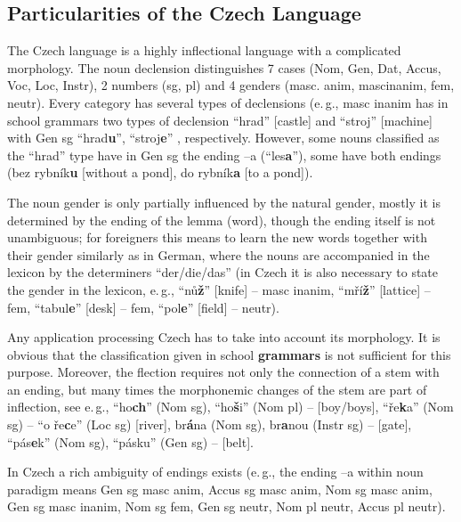 \begin{multicols}{2}
 
\subsection{Particularities of the Czech Language }

The Czech language is a highly inflectional language with a complicated morphology. The noun declension distinguishes 7 cases (Nom, Gen, Dat, Accus, Voc, Loc, Instr), 2 numbers (sg, pl) and 4 genders (masc. anim, mascinanim, fem, neutr). Every category has several types of declensions (e.\,g., masc inanim has in school grammars two types of declension “hrad” {[}castle{]} and “stroj” {[}machine{]} with Gen sg “hrad\textbf{u}”, “stroj\textbf{e}” , respectively. However, some nouns classified as the “hrad” type have in Gen sg the ending –a (“les\textbf{a}”), some have both endings (bez rybník\textbf{u} {[}without a pond{]}, do rybník\textbf{a} {[}to a pond{]}).

The noun gender is only partially influenced by the natural gender, mostly it is determined by the ending of the lemma (word), though the ending itself  is not unambiguous; for foreigners this means to learn the new words together with their gender similarly as in German, where the nouns are accompanied in the lexicon by the determiners “der/die/das”  (in Czech it is also necessary to state the gender in the lexicon, e.\,g., “nů\textbf{ž}” {[}knife{]} – masc inanim, “mří\textbf{ž}”  {[}lattice{]} --  fem, “tabul\textbf{e}” {[}desk{]} – fem, “pol\textbf{e}” {[}field{]} – neutr).

Any application processing Czech has to take into account its morphology. It is obvious that the classification given in school \textbf{grammars} is not sufficient for this purpose. Moreover, the flection requires not only the connection of a stem with an ending, but many times the morphonemic changes of the stem are part of inflection, see e.\,g., “ho\textbf{ch}” (Nom sg), “ho\textbf{š}i” (Nom pl) – {[}boy/boys{]}, “ře\textbf{k}a” (Nom sg) – “o ře\textbf{c}e” (Loc sg) {[}river{]}, br\textbf{á}na (Nom sg), br\textbf{a}nou (Instr sg) – {[}gate{]}, “pás\textbf{e}k” (Nom sg), “pásku” (Gen sg) – {[}belt{]}.

In Czech a rich ambiguity of endings exists (e.\,g., the ending –a within noun paradigm means Gen sg masc anim, Accus sg masc anim, Nom sg masc anim, Gen sg masc inanim, Nom sg fem, Gen sg neutr, Nom pl neutr, Accus pl neutr).


\end{multicols}
